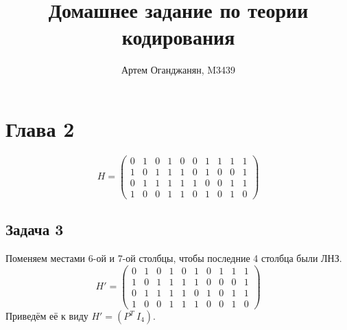 \documentclass{article}
\title{Домашнее задание по теории кодирования}
\author{Артем Оганджанян, M3439}
\date{}
\begin{document}
\maketitle

\section{\texorpdfstring{Глава 2}{Section 2}}
\[
    H =
    \begin{pmatrix}
        0 & 1 & 0 & 1 & 0 & 0 & 1 & 1 & 1 & 1 \\
        1 & 0 & 1 & 1 & 1 & 0 & 1 & 0 & 0 & 1 \\
        0 & 1 & 1 & 1 & 1 & 1 & 0 & 0 & 1 & 1 \\
        1 & 0 & 0 & 1 & 1 & 0 & 1 & 0 & 1 & 0
    \end{pmatrix}
\]
\subsection{\texorpdfstring{Задача 3}{Task 3}}
Поменяем местами 6-ой и 7-ой столбцы, чтобы последние 4 столбца были ЛНЗ.
\[
    H' =
    \begin{pmatrix}
        0 & 1 & 0 & 1 & 0 & 1 & 0 & 1 & 1 & 1 \\
        1 & 0 & 1 & 1 & 1 & 1 & 0 & 0 & 0 & 1 \\
        0 & 1 & 1 & 1 & 1 & 0 & 1 & 0 & 1 & 1 \\
        1 & 0 & 0 & 1 & 1 & 1 & 0 & 0 & 1 & 0
    \end{pmatrix}
\]
Приведём её к виду $H' = (P^T\ I_4)$.
\end{document}
